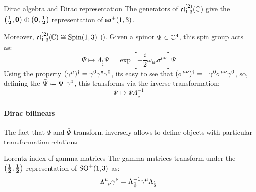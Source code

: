 \begin{proposition}{Dirac algebra and Dirac representation}{}
  The generators of $ \mathfrak{cl}_{1,3}^{(2)}(\mathbb{C}) $ give the $ \mathbf{\left( \frac{1}{2},0 \right)} \oplus \mathbf{\left( 0,\frac{1}{2} \right)} $ representation of $ \mathfrak{so}^+(1,3) $.
\end{proposition}

Moreover, $ \mathfrak{cl}_{1,3}^{(2)}(\mathbb{C}) \cong \operatorname{Spin}(1,3) $ (). Given a spinor $ \Psi \in \mathbb{C}^4 $, this spin group acts as:
\begin{equation*}
  \Psi \mapsto \Lambda_{\frac{1}{2}} \Psi = \exp \left[ -\frac{i}{2} \omega_{\mu \nu} \sigma^{\mu \nu} \right] \Psi
\end{equation*}
Using the property $ (\gamma^\mu)^\dagger = \gamma^0 \gamma^\mu \gamma^0 $, its easy to see that $ (\sigma^{\mu \nu})^\dagger = - \gamma^0 \sigma^{\mu \nu} \gamma^0 $, so, defining the  $ \bar{\Psi} \defeq \Psi\dg \gamma^0 $, this transforms via the inverse transformation:
\begin{equation*}
  \bar{\Psi} \mapsto \bar{\Psi} \Lambda_{\frac{1}{2}}^{-1}
\end{equation*}

\paragraph{Dirac bilinears}

The fact that $ \Psi $ and $ \bar{\Psi} $ transform inversely allows to define objects with particular transformation relations.

\begin{theorem}{Lorentz index of gamma matrices}{}
  The gamma matrices transform under the $ \mathbf{\left( \frac{1}{2},\frac{1}{2} \right)} $ representation of $ \mathrm{SO}^+(1,3) $ as:
  \begin{equation}
    \tensor{\Lambda}{^\mu_\nu} \gamma^\nu = \Lambda_{\frac{1}{2}}^{-1} \gamma^\mu \Lambda_{\frac{1}{2}}
    \label{eq:gamma-lor-tr}
  \end{equation}
\end{theorem}

